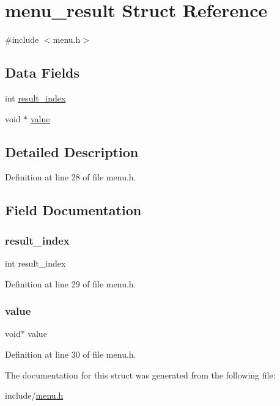 \hypertarget{structmenu__result}{}\section{menu\+\_\+result Struct Reference}
\label{structmenu__result}


{\ttfamily \#include $<$menu.\+h$>$}

\subsection*{Data Fields}
\begin{DoxyCompactItemize}
\item 
int \hyperlink{structmenu__result_ae3056b14bf39f02e9435b9b5b8f71bad}{result\+\_\+index}
\item 
void $\ast$ \hyperlink{structmenu__result_a0f61d63b009d0880a89c843bd50d8d76}{value}
\end{DoxyCompactItemize}


\subsection{Detailed Description}


Definition at line 28 of file menu.\+h.



\subsection{Field Documentation}
\mbox{\label{structmenu__result_ae3056b14bf39f02e9435b9b5b8f71bad}} 
\subsubsection{\texorpdfstring{result\+\_\+index}{result\_index}}
{\footnotesize\ttfamily int result\+\_\+index}



Definition at line 29 of file menu.\+h.

\mbox{\label{structmenu__result_a0f61d63b009d0880a89c843bd50d8d76}} 
\subsubsection{\texorpdfstring{value}{value}}
{\footnotesize\ttfamily void$\ast$ value}



Definition at line 30 of file menu.\+h.



The documentation for this struct was generated from the following file\+:\begin{DoxyCompactItemize}
\item 
include/\hyperlink{menu_8h}{menu.\+h}\end{DoxyCompactItemize}
